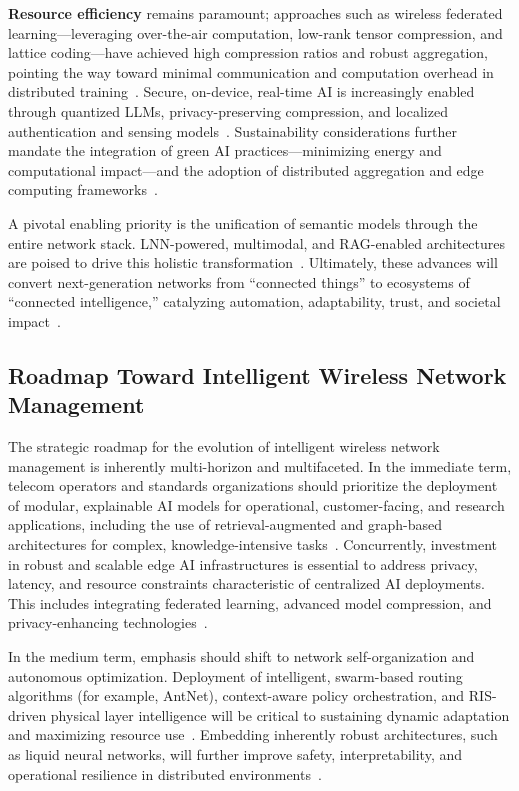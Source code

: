 \documentclass[sigconf]{acmart}
\begin{document}
\textbf{Resource efficiency} remains paramount; approaches such as wireless federated learning---leveraging over-the-air computation, low-rank tensor compression, and lattice coding---have achieved high compression ratios and robust aggregation, pointing the way toward minimal communication and computation overhead in distributed training~\cite{ref17}. Secure, on-device, real-time AI is increasingly enabled through quantized LLMs, privacy-preserving compression, and localized authentication and sensing models~\cite{ref18,ref19,ref20,ref24}. Sustainability considerations further mandate the integration of green AI practices---minimizing energy and computational impact---and the adoption of distributed aggregation and edge computing frameworks~\cite{ref16,ref19,ref20,ref24,ref25}.

A pivotal enabling priority is the unification of semantic models through the entire network stack. LNN-powered, multimodal, and RAG-enabled architectures are poised to drive this holistic transformation~\cite{ref7,ref16,ref17,ref18,ref19,ref20,ref21,ref22,ref23,ref24,ref25,ref26,ref30,ref35,ref46,ref49}. Ultimately, these advances will convert next-generation networks from ``connected things'' to ecosystems of ``connected intelligence,'' catalyzing automation, adaptability, trust, and societal impact~\cite{ref16,ref20,ref24,ref49}.

\subsection{Roadmap Toward Intelligent Wireless Network Management}

The strategic roadmap for the evolution of intelligent wireless network management is inherently multi-horizon and multifaceted. In the immediate term, telecom operators and standards organizations should prioritize the deployment of modular, explainable AI models for operational, customer-facing, and research applications, including the use of retrieval-augmented and graph-based architectures for complex, knowledge-intensive tasks~\cite{ref7, ref16, ref30}. Concurrently, investment in robust and scalable edge AI infrastructures is essential to address privacy, latency, and resource constraints characteristic of centralized AI deployments. This includes integrating federated learning, advanced model compression, and privacy-enhancing technologies~\cite{ref17, ref19, ref20, ref24, ref25, ref49}.

In the medium term, emphasis should shift to network self-organization and autonomous optimization. Deployment of intelligent, swarm-based routing algorithms (for example, AntNet), context-aware policy orchestration, and RIS-driven physical layer intelligence will be critical to sustaining dynamic adaptation and maximizing resource use~\cite{ref15, ref21, ref22, ref26, ref27, ref28, ref46}. Embedding inherently robust architectures, such as liquid neural networks, will further improve safety, interpretability, and operational resilience in distributed environments~\cite{ref19, ref30, ref35}.
\end{document}
